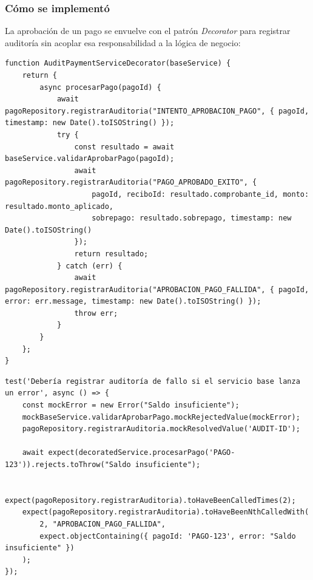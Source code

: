 \documentclass[12pt,a4paper]{article}
\begin{document}
\subsubsection*{Cómo se implementó}

La aprobación de un pago se envuelve con el patrón \emph{Decorator} para registrar
auditoría sin acoplar esa responsabilidad a la lógica de negocio:

\begin{lstlisting}[caption={\texttt{AuditPaymentServiceDecorator} (\texttt{src/core/business/patterns/auditDecorator.js})}]
function AuditPaymentServiceDecorator(baseService) {
    return {
        async procesarPago(pagoId) {
            await pagoRepository.registrarAuditoria("INTENTO_APROBACION_PAGO", { pagoId, timestamp: new Date().toISOString() });
            try {
                const resultado = await baseService.validarAprobarPago(pagoId);
                await pagoRepository.registrarAuditoria("PAGO_APROBADO_EXITO", {
                    pagoId, reciboId: resultado.comprobante_id, monto: resultado.monto_aplicado,
                    sobrepago: resultado.sobrepago, timestamp: new Date().toISOString()
                });
                return resultado;
            } catch (err) {
                await pagoRepository.registrarAuditoria("APROBACION_PAGO_FALLIDA", { pagoId, error: err.message, timestamp: new Date().toISOString() });
                throw err;
            }
        }
    };
}
\end{lstlisting}

\begin{lstlisting}[caption={Prueba de auditoría en caso de fallo (\texttt{auditDecorator.test.js}, con \texttt{jest.mock})}]
test('Debería registrar auditoría de fallo si el servicio base lanza un error', async () => {
    const mockError = new Error("Saldo insuficiente");
    mockBaseService.validarAprobarPago.mockRejectedValue(mockError);
    pagoRepository.registrarAuditoria.mockResolvedValue('AUDIT-ID');

    await expect(decoratedService.procesarPago('PAGO-123')).rejects.toThrow("Saldo insuficiente");

    expect(pagoRepository.registrarAuditoria).toHaveBeenCalledTimes(2);
    expect(pagoRepository.registrarAuditoria).toHaveBeenNthCalledWith(
        2, "APROBACION_PAGO_FALLIDA",
        expect.objectContaining({ pagoId: 'PAGO-123', error: "Saldo insuficiente" })
    );
});
\end{lstlisting}
\end{document}
